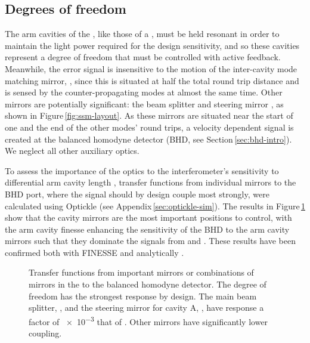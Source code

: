 \subsection{\label{sec:ssm-dofs}Degrees of freedom}
The arm cavities of the \SSM{}, like those of a \FPMI{}, must be held resonant in order to maintain the light power required for the design sensitivity, and so these cavities represent a degree of freedom that must be controlled with active feedback. Meanwhile, the error signal is insensitive to the motion of the inter-cavity mode matching mirror, \MNINE{}, since this is situated at half the total round trip distance and is sensed by the counter-propagating modes at almost the same time. Other mirrors are potentially significant: the beam splitter \MSIX{} and steering mirror \MSEVEN{}, as shown in Figure\,\ref{fig:ssm-layout}. As these mirrors are situated near the start of one and the end of the other modes' round trips, a velocity dependent signal is created at the balanced homodyne detector (\gls{BHD}, see Section\,\ref{sec:bhd-intro}). We neglect all other auxiliary optics.

To assess the importance of the optics to the interferometer's sensitivity to differential arm cavity length \LMINUS{}, transfer functions from individual mirrors to the \gls{BHD} port, where the \LMINUS{} signal should by design couple most strongly, were calculated using Optickle (see Appendix\,\ref{sec:optickle-sim}). The results in Figure\,\ref{fig:ssm-mirror-tfs} show that the cavity mirrors are the most important positions to control, with the arm cavity finesse enhancing the sensitivity of the \gls{BHD} to the arm cavity mirrors such that they dominate the signals from \MSIX{} and \MSEVEN{}. These results have been confirmed both with \gls{FINESSE} and analytically \cite{Glaefke2015}.

\begin{figure}
  \centering
  
  \caption[Transfer functions from important mirrors/combinations of mirrors in the \SSMEXPT{} to the balanced homodyne detector]{\label{fig:ssm-mirror-tfs}Transfer functions from important mirrors or combinations of mirrors in the \SSMEXPT{} to the balanced homodyne detector. The \LMINUS{} degree of freedom has the strongest response by design. The main beam splitter, \MSIX{}, and the steering mirror for cavity A, \MSEVEN{}, have response a factor of \num{e-3} that of \LMINUS{}. Other mirrors have significantly lower coupling.}
\end{figure}


